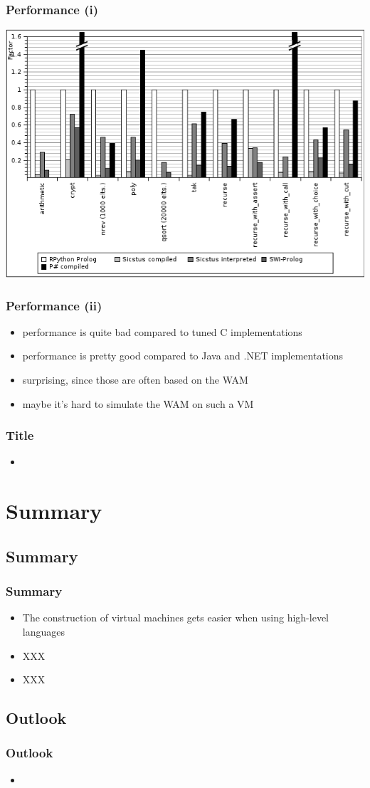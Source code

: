 \documentclass[utf8]{beamer}
\begin{document}
\begin{frame}
  \frametitle{Performance (i)}
  \includegraphics[scale=0.4]{image/bench.png}
\end{frame}


\begin{frame}
  \frametitle{Performance (ii)}
  \begin{itemize}
  \item
    performance is quite bad compared to tuned C implementations
  \item
    performance is pretty good compared to Java and .NET implementations
  \item
    surprising, since those are often based on the WAM
  \item
    maybe it's hard to simulate the WAM on such a VM
  \end{itemize}
\end{frame}

\begin{frame}
  \frametitle{Title}
  \begin{itemize}
  \item
  \end{itemize}
\end{frame}


\section*{Summary}
\subsection*{Summary}
\begin{frame}
  \frametitle<presentation>{Summary}

  \begin{itemize}
  \item
    The construction of virtual machines gets easier when using high-level
    languages
  \item
    XXX
  \item
    XXX
  \end{itemize}
\end{frame}
\subsection*{Outlook}
\begin{frame}
  \frametitle<presentation>{Outlook}
  \begin{itemize}
  \item
  \end{itemize}
\end{frame}
\end{document}
